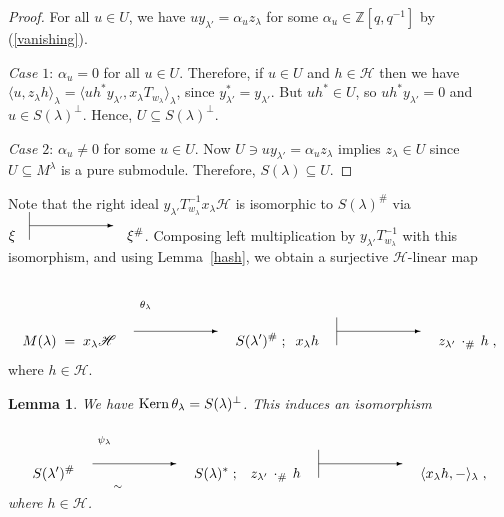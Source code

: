 \documentclass[twoside]{amsart}
\newcommand{\lra}{\begin{picture}(80,17)
                  \put(10,10){\vector(1,0){60}}
                  \end{picture}}
\newcommand{\lraa}[1]{\begin{picture}(80,50)      %
                      \put(  10,  10){\vector(1,0){60}}
                      \put(  10,  27){\makebox[6mm]{$\scriptstyle #1$}}
                      \end{picture} }
\newcommand{\lramaps}{\begin{picture}(80,17)
                  \put(10,10){\vector(1,0){60}}
                  \put(10,0){\line(0,1){20}}
                  \end{picture}}
\newcommand{\lraisoa}[1]{\begin{picture}(80,40)
                         \put(   0,   0){$\lra$}
                         \put(  10,  25){\makebox[6mm]{$\scriptstyle #1$}}
                         \put(  25,  -8){$\scriptstyle\sim$}
                         \end{picture} }
\numberwithin{equation}{section}
\newtheorem{Lemma}[equation]{Lemma}
\theoremstyle{remark}
\let\>\rangle
\let\<\langle
\let\ss\subseteq
\def\Kern{\mathop{\rm Kern}\nolimits}
\def\Z{{\mathbb Z}}
\def\H{\mathscr H}
\begin{document}
\begin{proof}
For all $u\in U$, we have $u y_{\lambda'} = \alpha_u z_\lambda$ for some $\alpha_u\in\Z[q,q^{-1}]$ by (\ref{vanishing}). 

{\it Case $1$}: $\alpha_u = 0$ for all $u\in U$. Therefore, if $u\in U$ and
$h\in\H$ then we have $\<u,z_\lambda h\>_\lambda = \<u h^*
y_{\lambda'},x_\lambda T_{w_\lambda}\>_\lambda$, since $y_{\lambda'}^*
= y_{\lambda'}$. But $u h^*\in U$, so $u h^* y_{\lambda'}
= 0$ and $u\in S(\lambda)^\perp$. Hence, $U\ss S(\lambda)^\perp$.

{\it Case $2$}: $\alpha_u \neq 0$ for some $u\in U$. Now $U\ni u
y_{\lambda'} = \alpha_u z_\lambda$ implies $z_\lambda\in U$ since
$U\ss M^\lambda$ is a pure submodule. Therefore, $S(\lambda)\ss U$.
\end{proof}

Note that the right ideal $y_{\lambda'} T_{w_\lambda}^{-1} x_\lambda\H$ is isomorphic to $S(\lambda)^\#$ via $\xi\lramaps\xi^\#$. Composing left multiplication
by $y_{\lambda'} T_{w_\lambda}^{-1}$ with this isomorphism, and using
Lemma~\ref{hash}, we obtain a surjective $\H$-linear map
$$
M(\lambda)\; =\; x_\lambda \H \; \lraa{\theta_\lambda} \; S(\lambda')^\# \; ; \;\; x_\lambda h \; \lramaps \; z_{\lambda'}\,\cdot_\#\, h\; , 
$$
where $h\in\H$.

\begin{Lemma}
We have $\Kern\theta_\lambda = S(\lambda)^\perp$. This induces an isomorphism
$$
S(\lambda')^\#\;\lraisoa{\psi_\lambda}\;S(\lambda)^* \; ;\;\;\; z_{\lambda'}\,\cdot_\#\, h \;\lramaps\;\< x_\lambda h , -\>_\lambda \; ,
$$
where $h\in\H$.
\end{Lemma}
\end{document}
